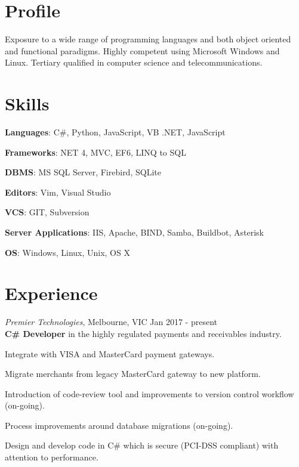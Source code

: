 \documentclass[line,margin]{res}
\begin{document}
    \address{ablack@fastmail.net\\ 0401 868 343}
    \address{https://github.com/aablack}

    \begin{resume}
        \section{Profile}
        Exposure to a wide range of programming languages and both object oriented and functional
        paradigms. Highly competent using Microsoft Windows and Linux. Tertiary qualified in computer
        science and telecommunications.

        \section{Skills}
        \begin{list}{}{\leftmargin=1em \itemsep=-2pt}
            \item{\textbf{Languages}: C\#, Python, JavaScript, VB .NET, JavaScript}
            \item{\textbf{Frameworks}: NET 4, MVC, EF6, LINQ to SQL}
            \item{\textbf{DBMS}: MS SQL Server, Firebird, SQLite}
            \item{\textbf{Editors}: Vim, Visual Studio}
            \item{\textbf{VCS}: GIT, Subversion}
            \item{\textbf{Server Applications}: IIS, Apache, BIND, Samba, Buildbot, Asterisk}
            \item{\textbf{OS}: Windows, Linux, Unix, OS X}
        \end{list}

        \section{Experience}
        \textit{Premier Technologies}, Melbourne, VIC \hfill Jan 2017 - present \\
        \textbf{C\# Developer} in the highly regulated payments and receivables industry.
        \begin{list}{}{\leftmargin=1em \itemsep=-2pt}
            	\item{Integrate with VISA and MasterCard payment gateways.}
            	\item{Migrate merchants from legacy MasterCard gateway to new platform.}
		\item{Introduction of code-review tool and improvements to version control workflow (on-going).}
        	\item{Process improvements around database migrations (on-going).}
        	\item{Design and develop code in C\# which is secure (PCI-DSS compliant) with attention to performance.}
        \end{list}


\end{resume}
\end{document}
